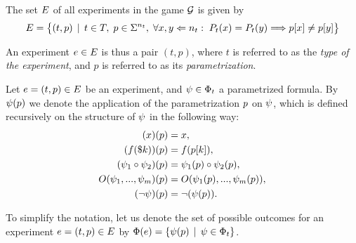 The set $E$ of all experiments in the game $\mathcal{G}$ is given by
\[
  E =
     \big\{ (t, p) \:\:|\:\: t\in T,\; p \in\Sigma^{n_t},\;
     \forall x,y<={n_t}:\; P_t(x)=P_t(y) ==> p[x] \not= p[y] \big\}
\]

An experiment $e\in E$ is thus a pair $(t, p)$, where
  $t$ is referred to as the \emph{type of the experiment},
 and $p$ is referred to as its \emph{parametrization}.

Let $e = (t, p)\in E$ be an experiment,
  and $\psi\in\Phi_t$ a parametrized formula.
By $\psi(p)$ we denote the application of
  the parametrization $p$ on $\psi$,
  which is defined recursively on the structure of $\psi$
  in the following way:
\begin{align}
(x)(p) &= x, \\
(f(\$k))(p) &= f(p[k]),\\
(\psi_1\circ\psi_2)(p) &= \psi_1(p) \circ \psi_2(p),\\
O(\psi_1, ..., \psi_m)(p) &= O(\psi_1(p), ..., \psi_m(p)),\\
(\neg\psi)(p) &= \neg(\psi(p)).
\end{align}

To simplify the notation, let us denote the set of possible outcomes for
  an experiment $e = (t, p) \in E$ by
  $\Phi(e) = \{ \psi(p) \:\:|\:\: \psi\in\Phi_t\}$.

